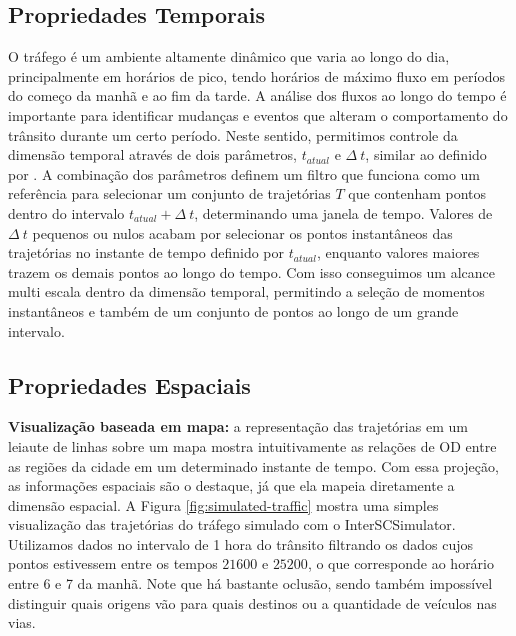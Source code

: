 \subsection{Propriedades Temporais}
O tráfego é um ambiente altamente dinâmico que varia ao longo do
dia, principalmente em horários de pico, tendo horários de máximo fluxo em
períodos do começo da manhã e ao fim da tarde. A análise dos fluxos ao
longo do tempo é importante para identificar mudanças e eventos que alteram o
comportamento do trânsito durante um certo período. Neste sentido, permitimos
controle da dimensão temporal através de dois parâmetros, $t_{atual}$ e
$\Delta~t$, similar ao definido por \citet{Klein2013}. A combinação dos
parâmetros definem um filtro que funciona como um referência para selecionar um
conjunto de trajetórias  ${T}$ que contenham pontos dentro do intervalo
$t_{atual} + \Delta~t$, determinando uma janela de tempo. Valores de $\Delta~t$
pequenos ou nulos acabam por selecionar os pontos instantâneos das trajetórias
no instante de tempo definido por $t_{atual}$, enquanto valores maiores trazem
os demais pontos ao longo do tempo. Com isso conseguimos um alcance multi
escala dentro da dimensão temporal, permitindo a seleção de momentos
instantâneos e também de um conjunto de pontos ao longo de um grande intervalo.

\subsection{Propriedades Espaciais}

\textbf{Visualização baseada em mapa:} a representação das trajetórias em um
leiaute de linhas sobre um mapa mostra intuitivamente as relações de OD entre
as regiões da cidade em um determinado instante de tempo. Com essa projeção, as
informações espaciais são o destaque, já que ela mapeia diretamente a dimensão
espacial. A Figura \ref{fig:simulated-traffic} mostra uma simples visualização das
trajetórias do tráfego simulado com o InterSCSimulator. Utilizamos dados no
intervalo de 1 hora do trânsito filtrando os dados cujos pontos estivessem
entre os tempos $21600$ e $25200$, o que corresponde ao horário entre 6 e 7 da
manhã. Note que há bastante oclusão, sendo também impossível distinguir
quais origens vão para quais destinos ou a quantidade de veículos nas vias.

